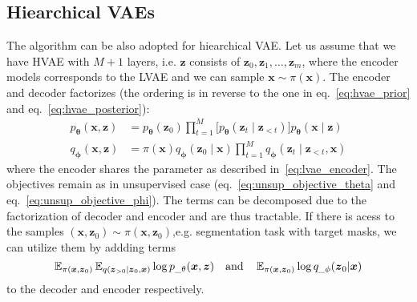\subsection{Hiearchical VAEs}
The algorithm can be also adopted for hiearchical VAE. Let us assume that we have HVAE with $M+1$ layers, i.e. $\boldsymbol{z}$ consists of 
$\boldsymbol{z}_0,\boldsymbol{z}_1,\dots,\boldsymbol{z}_m$, where the encoder models corresponds to the LVAE and we can sample $\boldsymbol{x} \sim \pi(\boldsymbol{x})$.
The encoder and decoder factorizes (the ordering is in reverse to the one in eq.~\ref{eq:hvae_prior} and eq.~\ref{eq:hvae_posterior}):
\begin{align*}
    p_{\boldsymbol{\theta}}(\boldsymbol{x},\boldsymbol{z})&=p_{\boldsymbol{\theta}}(\boldsymbol{z}_{0}) \prod_{t=1}^{M}\bigl[p_{\boldsymbol{\theta}}(\boldsymbol{z}_{t}\mid\boldsymbol{z}_{<t}) \bigr]  p_{\boldsymbol{\theta}}(\boldsymbol{x}\mid\boldsymbol{z})  \\
    q_{\boldsymbol{\phi}}(\boldsymbol{x},\boldsymbol{z}) &=\pi(\boldsymbol{x})q_{\boldsymbol{\phi}}(\boldsymbol{z}_{0}\mid\boldsymbol{x}) \prod_{t=1}^{M}  q_{\boldsymbol{\phi}}(\boldsymbol{z}_{t}\mid\boldsymbol{z}_{<t},\boldsymbol{x}) 
\end{align*}
where the encoder shares the parameter as described in~\ref{eq:lvae_encoder}. The objectives remain as in unsupervised case (eq.~\ref{eq:unsup_objective_theta} and eq.~\ref{eq:unsup_objective_phi}).
The terms can be decomposed due to the factorization of decoder and encoder and are thus tractable.  If there is 
acess to the samples $(\boldsymbol{x},\boldsymbol{z}_0) \sim \pi(\boldsymbol{x},\boldsymbol{z}_0)$,e.g. segmentation task with target masks, we can utilize them 
by addding terms
$$
\operatorname{\mathbb{E}}_{\pi(\boldsymbol{x},\boldsymbol{z}_0)}\operatorname{\mathbb{E}}_{q(\boldsymbol{z}_{>0} |\boldsymbol{z}_0,\boldsymbol{x})} \log p_{\_\theta}(\boldsymbol{x},\boldsymbol{z}) 
\quad\text{and}\quad
\operatorname{\mathbb{E}}_{\pi(\boldsymbol{x},\boldsymbol{z}_0)} \log q_{\_\phi}(\boldsymbol{z}_0|\boldsymbol{x})
$$
to the decoder and encoder respectively. 








